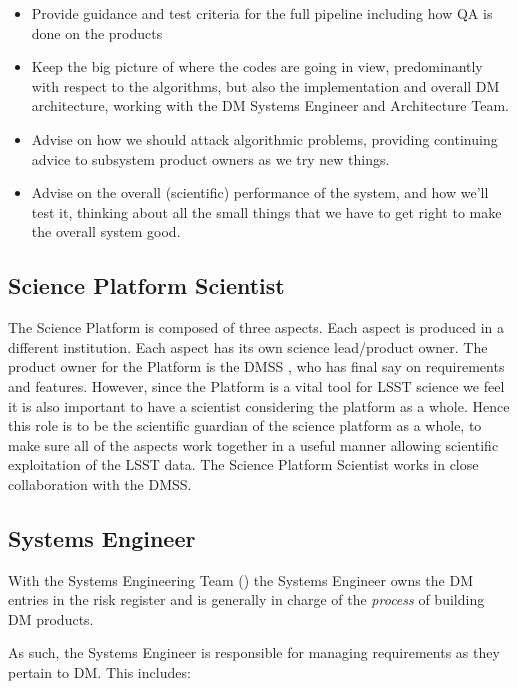 \begin{itemize}

\item Provide guidance and test criteria for the full pipeline including how QA is done on the products
\item Keep the big picture of where the codes are going in view, predominantly with respect to the algorithms, but also the implementation and overall DM architecture, working with the DM Systems Engineer and Architecture Team. 
\item Advise on how we should attack algorithmic problems, providing continuing advice to subsystem product owners as we try new things.
\item Advise on the overall (scientific) performance of the system, and how we'll test it, thinking about all the small things that we have to get right to make the overall system good.

\end{itemize}

\subsection{Science Platform Scientist \label{role:scip}}
The Science Platform is composed of three aspects. Each aspect is produced in a different institution.
Each aspect has its own science lead/product owner.
The product owner for the Platform is the \gls{DMSS} , who has final say on requirements and features.
However, since the Platform is a vital tool for \gls{LSST} science we feel it is also important to have a scientist considering the platform as a whole.
Hence this role is to be the scientific guardian of the science platform as a whole, to make sure all of the aspects work together in a useful manner allowing scientific exploitation of the \gls{LSST} data. The \gls{Science Platform} Scientist works in close collaboration with the \gls{DMSS}.

\subsection{Systems Engineer \label{role:sysengineer}}

With the \gls{Systems Engineering} Team () the \gls{Systems Engineer} owns the \gls{DM} entries in the risk register and is generally in charge of the \textit{process} of building \gls{DM} products.

As such, the \gls{Systems Engineer} is responsible for managing requirements as they pertain to \gls{DM}.
This includes:

